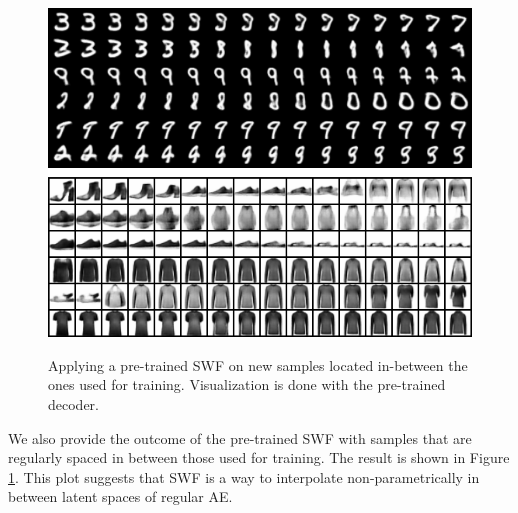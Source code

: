 \begin{figure}
\centering
\includegraphics[width=0.95\columnwidth]{figures/interpolations.png}
\label{fig:interpolation}
\caption{Applying a pre-trained SWF on new samples located in-between the ones used for training. Visualization is done with the pre-trained decoder.}
\end{figure}

We also provide the outcome of the pre-trained SWF with samples that are regularly spaced in between those used for training. The result is shown in Figure \ref{fig:interpolation}. This plot suggests that SWF is a way to interpolate non-parametrically in between latent spaces of regular AE.
























